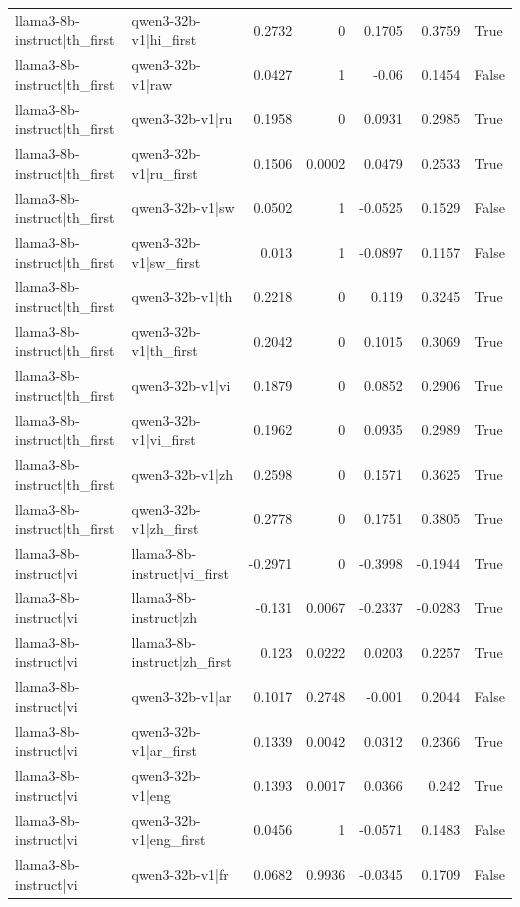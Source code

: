 \begin{table}
\begin{tabular}{l l r r r r l}
llama3-8b-instruct|th_first & qwen3-32b-v1|hi_first & 0.2732 & 0 & 0.1705 & 0.3759 & True \\
llama3-8b-instruct|th_first & qwen3-32b-v1|raw & 0.0427 & 1 & -0.06 & 0.1454 & False \\
llama3-8b-instruct|th_first & qwen3-32b-v1|ru & 0.1958 & 0 & 0.0931 & 0.2985 & True \\
llama3-8b-instruct|th_first & qwen3-32b-v1|ru_first & 0.1506 & 0.0002 & 0.0479 & 0.2533 & True \\
llama3-8b-instruct|th_first & qwen3-32b-v1|sw & 0.0502 & 1 & -0.0525 & 0.1529 & False \\
llama3-8b-instruct|th_first & qwen3-32b-v1|sw_first & 0.013 & 1 & -0.0897 & 0.1157 & False \\
llama3-8b-instruct|th_first & qwen3-32b-v1|th & 0.2218 & 0 & 0.119 & 0.3245 & True \\
llama3-8b-instruct|th_first & qwen3-32b-v1|th_first & 0.2042 & 0 & 0.1015 & 0.3069 & True \\
llama3-8b-instruct|th_first & qwen3-32b-v1|vi & 0.1879 & 0 & 0.0852 & 0.2906 & True \\
llama3-8b-instruct|th_first & qwen3-32b-v1|vi_first & 0.1962 & 0 & 0.0935 & 0.2989 & True \\
llama3-8b-instruct|th_first & qwen3-32b-v1|zh & 0.2598 & 0 & 0.1571 & 0.3625 & True \\
llama3-8b-instruct|th_first & qwen3-32b-v1|zh_first & 0.2778 & 0 & 0.1751 & 0.3805 & True \\
llama3-8b-instruct|vi & llama3-8b-instruct|vi_first & -0.2971 & 0 & -0.3998 & -0.1944 & True \\
llama3-8b-instruct|vi & llama3-8b-instruct|zh & -0.131 & 0.0067 & -0.2337 & -0.0283 & True \\
llama3-8b-instruct|vi & llama3-8b-instruct|zh_first & 0.123 & 0.0222 & 0.0203 & 0.2257 & True \\
llama3-8b-instruct|vi & qwen3-32b-v1|ar & 0.1017 & 0.2748 & -0.001 & 0.2044 & False \\
llama3-8b-instruct|vi & qwen3-32b-v1|ar_first & 0.1339 & 0.0042 & 0.0312 & 0.2366 & True \\
llama3-8b-instruct|vi & qwen3-32b-v1|eng & 0.1393 & 0.0017 & 0.0366 & 0.242 & True \\
llama3-8b-instruct|vi & qwen3-32b-v1|eng_first & 0.0456 & 1 & -0.0571 & 0.1483 & False \\
llama3-8b-instruct|vi & qwen3-32b-v1|fr & 0.0682 & 0.9936 & -0.0345 & 0.1709 & False \\

\end{tabular}
\end{table}
